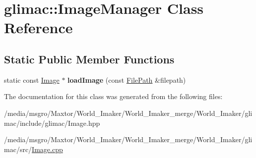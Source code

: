 \hypertarget{classglimac_1_1ImageManager}{}\section{glimac\+:\+:Image\+Manager Class Reference}
\label{classglimac_1_1ImageManager}
\subsection*{Static Public Member Functions}
\begin{DoxyCompactItemize}
\item 
\mbox{\label{classglimac_1_1ImageManager_a491965842042b2ef01eade7136ddb54d}} 
static const \hyperlink{classglimac_1_1Image}{Image} $\ast$ {\bfseries load\+Image} (const \hyperlink{classglimac_1_1FilePath}{File\+Path} \&filepath)
\end{DoxyCompactItemize}


The documentation for this class was generated from the following files\+:\begin{DoxyCompactItemize}
\item 
/media/msgro/\+Maxtor/\+World\+\_\+\+Imaker/\+World\+\_\+\+Imaker\+\_\+merge/\+World\+\_\+\+Imaker/glimac/include/glimac/Image.\+hpp\item 
/media/msgro/\+Maxtor/\+World\+\_\+\+Imaker/\+World\+\_\+\+Imaker\+\_\+merge/\+World\+\_\+\+Imaker/glimac/src/\hyperlink{Image_8cpp}{Image.\+cpp}\end{DoxyCompactItemize}
